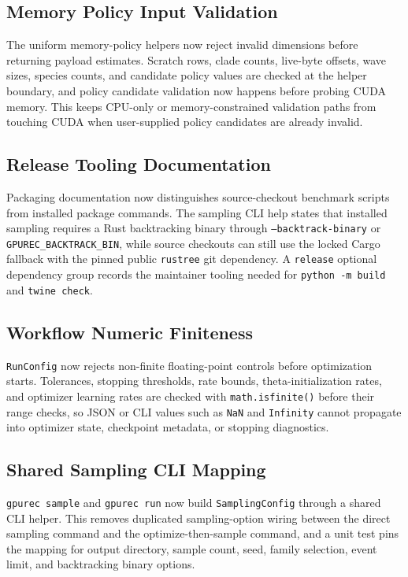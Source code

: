 \documentclass[11pt]{article}
\begin{document}
\subsection{Memory Policy Input Validation}

The uniform memory-policy helpers now reject invalid dimensions before returning
payload estimates.  Scratch rows, clade counts, live-byte offsets, wave sizes,
species counts, and candidate policy values are checked at the helper boundary,
and policy candidate validation now happens before probing CUDA memory.
This keeps CPU-only or memory-constrained validation paths from touching CUDA
when user-supplied policy candidates are already invalid.

\subsection{Release Tooling Documentation}

Packaging documentation now distinguishes source-checkout benchmark scripts
from installed package commands.  The sampling CLI help states that installed
sampling requires a Rust backtracking binary through \texttt{--backtrack-binary}
or \texttt{GPUREC\_BACKTRACK\_BIN}, while source checkouts can still use the
locked Cargo fallback with the pinned public \texttt{rustree} git dependency.
A \texttt{release} optional dependency group records the maintainer
tooling needed for \texttt{python -m build} and \texttt{twine check}.

\subsection{Workflow Numeric Finiteness}

\texttt{RunConfig} now rejects non-finite floating-point controls before
optimization starts.  Tolerances, stopping thresholds, rate bounds,
theta-initialization rates, and optimizer learning rates are checked with
\texttt{math.isfinite()} before their range checks, so JSON or CLI values such
as \texttt{NaN} and \texttt{Infinity} cannot propagate into optimizer state,
checkpoint metadata, or stopping diagnostics.

\subsection{Shared Sampling CLI Mapping}

\texttt{gpurec sample} and \texttt{gpurec run} now build
\texttt{SamplingConfig} through a shared CLI helper.  This removes duplicated
sampling-option wiring between the direct sampling command and the
optimize-then-sample command, and a unit test pins the mapping for output
directory, sample count, seed, family selection, event limit, and backtracking
binary options.
\end{document}
